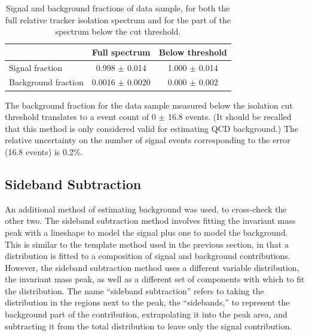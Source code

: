 \begin{table}[htbp]
  \begin{center}
    \caption[\fixspacing Signal and background fractions of data sample]{
      \fixspacing Signal and background fractions of data sample, 
      for both the full relative tracker isolation 
      spectrum and for the part of the spectrum 
      below the cut threshold.  
    }
    \label{TableSignalBGFractions}
    \begin{tabular}[]{ | l | c | c | }
      \hline
      & Full spectrum & Below threshold  \\ \hline \hline
      Signal fraction & 0.998 $\pm$ 0.014 & 1.000 $\pm$ 0.014 \\ \hline 
      Background fraction & 0.0016 $\pm$ 0.0020 & 0.000 $\pm$ 0.002 \\ \hline
    \end{tabular}
  \end{center}
\end{table}

The background fraction for the data sample measured 
below the isolation cut threshold 
translates to a event count of 0 $\pm$ 16.8 events.  
(It should be recalled that this method is only 
considered valid for estimating QCD background.)  
The relative uncertainty on the number of signal 
events corresponding to the error (16.8 events) 
is 0.2\%.  %


\subsection{Sideband Subtraction}
\label{anMeth:BGSubSideband}

An additional method of estimating background was 
used, %
to cross-check the other two.  
The sideband subtraction method 
involves fitting the invariant mass 
peak with a lineshape to model the signal plus 
one to model the background. %
This is similar to the template method used in 
the previous section, 
in that a distribution is fitted to a composition 
of signal and background contributions.  
However, the sideband subtraction method 
uses a different variable distribution, 
the invariant mass peak, 
as well as a different set of components 
with which to fit the distribution.  
The name ``sideband subtraction'' refers 
to taking the distribution in 
the regions next to the peak, 
the ``sidebands,'' 
to represent the background part of the contribution, 
extrapolating it into the peak area, and 
subtracting it from the total distribution 
to leave only the signal contribution.  

